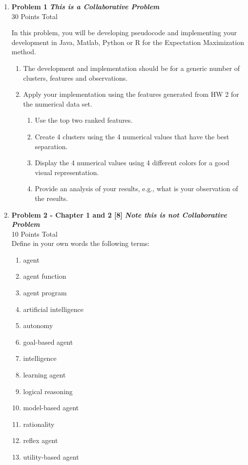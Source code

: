 \documentclass{article}
\begin{document}
\begin{enumerate}

    \item \textbf{Problem 1}  \textbf{\emph{This is a Collaborative Problem}}\\
    30 Points Total 

In this problem, you will be developing pseudocode and implementing your development in Java, Matlab, Python or R for the Expectation Maximization method. 

  	\begin{enumerate}
		\item The development and implementation should be for a generic number of clusters, features and observations.
		\item Apply your implementation using the features generated from HW 2 for the numerical data set.
		\begin{enumerate}
			\item Use the top two ranked features.
			\item Create 4 clusters using the 4 numerical values that have the best separation.
			\item Display the 4 numerical values using 4 different colors for a good visual representation.
			\item Provide an analysis of your results, e.g., what is your observation of the results.
		\end{enumerate}
	\end{enumerate}

    \vspace{5mm}

    \item \textbf{Problem 2 - Chapter 1 and 2 [8]} \textbf{\emph{Note this is not Collaborative Problem}}\\
    10 Points Total\\
    
    Define in your own words the following terms: 
    \begin{enumerate}
		\item agent
		\item agent function
		\item agent program
		\item artificial intelligence
		\item autonomy
		\item goal-based agent
		\item intelligence
		\item learning agent
		\item logical reasoning
		\item model-based agent
		\item rationality 
		\item reflex agent
		\item utility-based agent
	\end{enumerate}
    

\end{enumerate}
\end{document}
